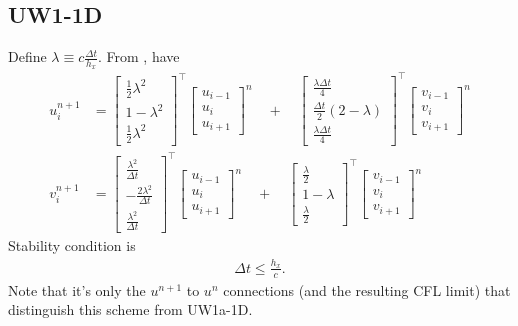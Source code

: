 \documentclass[12pt]{article}
\begin{document}
\subsection{UW1-1D}
Define $\lambda \equiv c \tfrac{\Delta t}{h_x}$.
From \cite[eqn. (48) \& (47)]{Banks2012}, have
\begin{align}
u_{i}^{n+1} &= 
\begin{bmatrix}
\tfrac{1}{2} \lambda^2 \\
1 - \lambda^2 \\
\tfrac{1}{2} \lambda^2 
\end{bmatrix}^\top
\begin{bmatrix}
u_{i-1} \\
u_i  \\
u_{i+1} 
\end{bmatrix}^n 
\quad 
+ 
\quad
\begin{bmatrix}
\tfrac{\lambda \Delta t}{4} \\
\tfrac{\Delta t}{2}(2 - \lambda) \\
\tfrac{\lambda \Delta t}{4} 
\end{bmatrix}^\top
\begin{bmatrix}
v_{i-1} \\
v_{i} \\
v_{i+1}  
\end{bmatrix}^n
\\
v_{i}^{n+1} &= 
\begin{bmatrix}
\tfrac{\lambda^2}{\Delta t} \\
- \tfrac{2 \lambda^2}{\Delta t} \\ 
\tfrac{\lambda^2}{\Delta t} 
\end{bmatrix}^\top
\begin{bmatrix}
u_{i-1} \\
u_{i} \\
u_{i+1}
\end{bmatrix}^n 
\quad 
+ 
\quad
\begin{bmatrix}
\tfrac{\lambda}{2} \\
1 - \lambda \\
\tfrac{\lambda }{2} 
\end{bmatrix}^\top
\begin{bmatrix}
v_{i-1} \\
v_{i}  \\
v_{i+1}  
\end{bmatrix}^n
\end{align}
Stability condition is
\begin{align}
\Delta t \leq \frac{h_x}{c}.
\end{align}
Note that it's only the $u^{n+1}$ to $u^n$ connections (and the resulting CFL limit) that distinguish this scheme from UW1a-1D.
\end{document}
